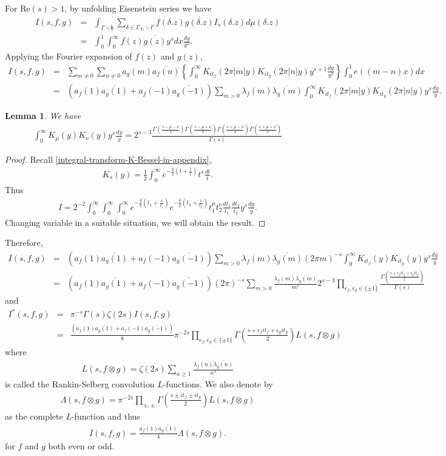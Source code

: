 \documentclass[11pt,reqno]{amsart}
\newcommand{\bna}{\begin{eqnarray*}}
\newcommand{\ena}{\end{eqnarray*}}
\newcommand{\mk}{\mathfrak}
\def\re{{\mathrm{Re}}}
\newtheorem{lemma}{Lemma}[section]
\theoremstyle{definition}
\begin{document}
For $\re(s)>1$, by unfolding Eisenstein series we have
\bna
I(s,f,g)&=&\int_{\Gamma\backslash\mk h}\sum_{\delta\in\Gamma_\infty\backslash\Gamma}
f(\delta.z)\overline{g(\delta.z)}I_s(\delta.z)d\mu(\delta.z)\\
&=&\int_{0}^1\int_{0}^\infty f(z)\overline{g(z)}y^sdx\frac{dy}{y^2}.
\ena
Applying the Fourier expansion of $f(z)$ and $g(z)$,
\bna
I(s,f,g)&=&\sum_{m\neq  0}\sum_{n\neq 0}a_g(m)\overline{a_f(n)}
\left\{\int_{0}^\infty
K_{it_f}(2\pi|m|y)K_{it_g}(2\pi|n|y)
y^{s+1}\frac{dy}{y^2}
\right\}\int_0^1 e((m-n)x)dx\\
&=&\left(a_f(1)\overline{a_g(1)}
+a_f(-1)\overline{a_g(-1)}\right)
\sum_{m> 0}\lambda_f(m)\overline{\lambda_g(m)}
\int_{0}^\infty
K_{it_f}(2\pi|m|y)K_{it_g}(2\pi|n|y)
y^{s}\frac{dy}{y}.
\ena
\begin{lemma}
We have
\bna
\int_{0}^\infty K_{\mu}(y)K_{\nu}(y)y^s\frac{dy}{y}
=2^{s-3}\frac{\Gamma\left(\frac{s-\mu-\nu}{2}\right)
\Gamma\left(\frac{s-\mu+\nu}{2}\right)
\Gamma\left(\frac{s+\mu-\nu}{2}\right)
\Gamma\left(\frac{s+\mu+\nu}{2}\right)
}{\Gamma(s)}
\ena
\end{lemma}
\begin{proof}
Recall \eqref{integral-transform-K-Bessel-in-appendix},
\bna
K_s(y)=\frac{1}{2}\int_0^\infty e^{-\frac{y}{2}(t+\frac{1}{t})}t^s\frac{dt}{t}.
\ena
Thus
\bna
I=2^{-2}\int_0^\infty\int_0^\infty\int_0^\infty
e^{-\frac{y}{2}(t_1+\frac{1}{t_1})}
e^{-\frac{y}{2}(t_2+\frac{1}{t_2})}t_1^{\mu}t_2^{\nu}\frac{dt_1}{t_1}
\frac{dt_2}{t_2} y^s\frac{dy}{y}.
\ena
Changing variable in a suitable situation, we will obtain the result.
\end{proof}
Therefore,
\bna
I(s,f,g)&=&
\left(a_f(1)\overline{a_g(1)}
+a_f(-1)\overline{a_g(-1)}\right)
\sum_{m> 0}\lambda_f(m)\overline{\lambda_g(m)}
(2\pi m)^{-s}
\int_{0}^\infty
K_{it_f}(y)K_{it_g}(y)
y^{s}\frac{dy}{y}\\
&=&
\left(a_f(1)\overline{a_g(1)}
+a_f(-1)\overline{a_g(-1)}\right)(2\pi)^{-s}
\sum_{m> 0}\frac{\lambda_f(m)\overline{\lambda_g(m)}}{m^s}
2^{s-3}\prod_{\epsilon_f,\epsilon_g\in\{\pm 1\}}
\frac{\Gamma\left(\frac{s+\epsilon_f it_f+\epsilon_git_g}{2}\right)}{\Gamma(s)}
\ena
and
\bna
I^*(s,f,g)&=&\pi^{-s}\Gamma(s)\zeta(2s)I(s,f,g)\\
&=&\frac{\left(a_f(1)\overline{a_g(1)}
+a_f(-1)\overline{a_g(-1)}\right)}{8}
\pi^{-2s}\prod_{\epsilon_f,\epsilon_g\in\{\pm 1\}}
\Gamma\left(\frac{s+\epsilon_fit_f+\epsilon_git_g}{2}\right)
L(s,f\otimes g)
\ena
where
\bna
L(s,f\otimes g)=\zeta(2s)\sum_{n\geq 1}\frac{\lambda_f(n)\overline{\lambda_g(n)}}{n^s}
\ena
is called the Rankin-Selberg convolution $L$-functions. We also denote by
\bna
\Lambda(s,f\otimes g)=\pi^{-2s}\prod_{\pm,\pm}\Gamma\left(\frac{s\pm it_f\pm it_g}{2}\right)
L(s,f\otimes g)
\ena
as the complete $L$-function and thus
\bna
I(s,f,g)=\frac{a_f(1)\overline{a_g(1)}}{4}\Lambda(s,f\otimes g).
\ena
for $f$ and $g$ both even or odd.
\end{document}
